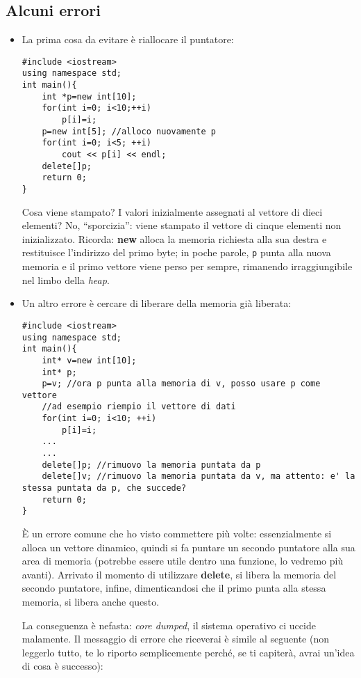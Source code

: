 \subsection{Alcuni errori}
\begin{itemize}

\item La prima cosa da evitare è riallocare il puntatore:
\begin{lstlisting}
#include <iostream>
using namespace std;
int main(){
	int *p=new int[10];
	for(int i=0; i<10;++i)
		p[i]=i;
	p=new int[5]; //alloco nuovamente p
	for(int i=0; i<5; ++i)
		cout << p[i] << endl;
	delete[]p;
	return 0;
}
\end{lstlisting}

Cosa viene stampato? I valori inizialmente assegnati al vettore di dieci elementi? No, ``sporcizia'': viene stampato il vettore di cinque elementi non inizializzato. Ricorda: \textbf{new} alloca la memoria richiesta alla sua destra e restituisce l'indirizzo del primo byte; in poche parole, \verb|p| punta alla nuova memoria e il primo vettore viene perso per sempre, rimanendo irraggiungibile nel limbo della \emph{heap}.

\item Un altro errore è cercare di liberare della memoria già liberata:
\begin{lstlisting}
#include <iostream>
using namespace std;
int main(){
	int* v=new int[10];
	int* p;
	p=v; //ora p punta alla memoria di v, posso usare p come vettore
	//ad esempio riempio il vettore di dati
	for(int i=0; i<10; ++i)
		p[i]=i;
	...
	...
	delete[]p; //rimuovo la memoria puntata da p
	delete[]v; //rimuovo la memoria puntata da v, ma attento: e' la stessa puntata da p, che succede?
	return 0;
}
\end{lstlisting}

È un errore comune che ho visto commettere più volte: essenzialmente si alloca un vettore dinamico, quindi si fa puntare un secondo puntatore alla sua area di memoria (potrebbe essere utile dentro una funzione, lo vedremo più avanti). Arrivato il momento di utilizzare \textbf{delete}, si libera la memoria del secondo puntatore, infine, dimenticandosi che il primo punta alla stessa memoria, si libera anche questo. 

La conseguenza è nefasta: \emph{core dumped}, il sistema operativo ci uccide malamente. 
Il messaggio di errore che riceverai è simile al seguente (non leggerlo tutto, te lo riporto semplicemente perché, se ti capiterà, avrai un'idea di cosa è successo):
\begin{tiny}
\begin{shaded}


\end{shaded}
\end{tiny}
\end{itemize}
